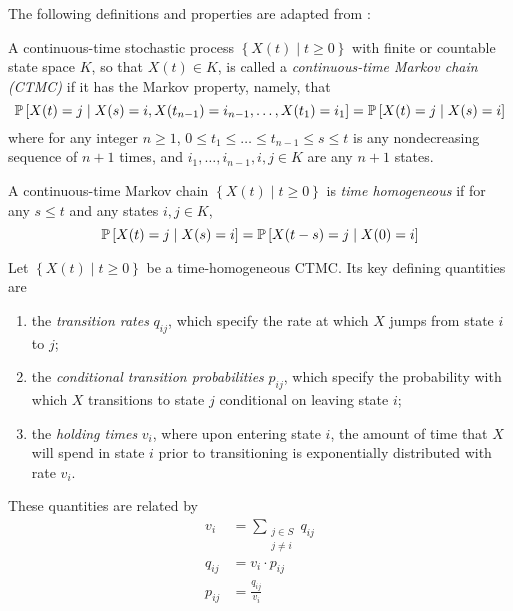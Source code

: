 The following definitions and properties are adapted from \citet{STAT455}:
\begin{defn}
A continuous-time stochastic process $\left\lbrace X(t) \; | \; t \geq 0 \right\rbrace$ with finite or countable state space $K$, so that $X(t) \in K$, is called a \emph{continuous-time Markov chain (CTMC)} if it has the Markov property, namely, that 
\begin{equation}
\P \left[ X(t) = j \; | \; X(s) = i, X(t_{n-1}) = i_{n-1}, \dots , X(t_1) = i_1 \right] = \P \left[ X(t) = j \; | \; X(s) = i \right]
\end{equation}
where for any integer $n \geq 1$, $0 \leq t_1 \leq \dots \leq t_{n-1} \leq s \leq t$ is any nondecreasing sequence of $n+1$ times, and $i_1,\dots,i_{n-1}, i, j \in K$ are any $n+1$ states.
\end{defn}
\begin{defn} A continuous-time Markov chain $\left\lbrace X(t) \; | \; t \geq 0 \right\rbrace$ is \emph{time homogeneous} if for any $s \leq t$ and any states $i,j \in K$,
\begin{equation}
\P \left[ X(t) = j \; | \; X(s) = i \right] = \P \left[ X(t-s) = j \; | \; X(0) = i \right]
\end{equation}
\end{defn}
\begin{ctmcprops}
Let $\left\lbrace X(t) \; | \; t \geq 0 \right\rbrace$ be a time-homogeneous CTMC. Its key defining quantities are
\begin{enumerate}
\item the \emph{transition rates} $q_{ij}$, which specify the rate at which $X$ jumps from state $i$ to $j$;
\item the \emph{conditional transition probabilities} $p_{ij}$, which specify the probability with which $X$ transitions to state $j$ conditional on leaving state $i$;
\item the \emph{holding times} $v_i$, where upon entering state $i$, the amount of time that $X$ will spend in state $i$ prior to transitioning is exponentially distributed with rate $v_i$.
\end{enumerate} 
These quantities are related by
\begin{align}
v_i & = \sum_{\substack{j \in S \\ j \neq i}} q_{ij} \\
q_{ij} & = v_i \cdot p_{ij} \\
p_{ij} & = \frac{q_{ij}}{v_i}
\end{align} 
\end{ctmcprops}
